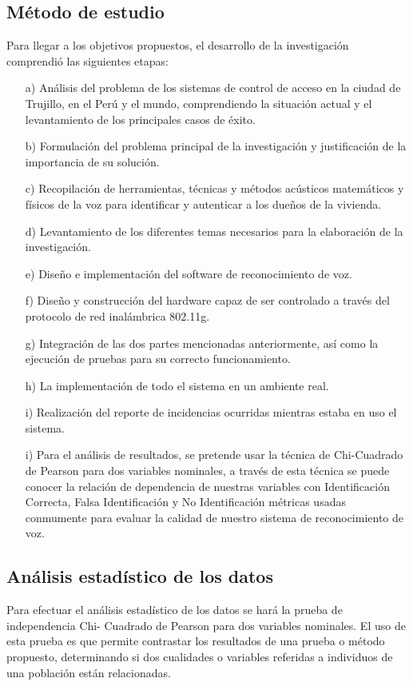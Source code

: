 \subsection{Método de estudio}
Para llegar a los objetivos propuestos, el desarrollo de la investigación comprendió las siguientes etapas:
\begin{enumerate}
\item[a)]Análisis del problema de los sistemas de control de acceso en la ciudad de Trujillo, en el Perú y el mundo, comprendiendo la situación actual y el levantamiento de los principales casos de éxito.
\item[b)]Formulación del problema principal de la investigación y justificación de la importancia de su solución.
\item[c)]Recopilación de herramientas, técnicas y métodos acústicos matemáticos y físicos de la voz para identificar y autenticar a los dueños de la vivienda.
\item[d)]Levantamiento de los diferentes temas necesarios para la elaboración de la investigación.
\item[e)]Diseño e implementación del software de reconocimiento de voz.
\item[f)]Diseño y construcción del hardware capaz de ser controlado a través del protocolo de red inalámbrica 802.11g.
\item[g)]Integración de las dos partes mencionadas anteriormente, así como la ejecución de pruebas para su correcto funcionamiento.
\item[h)]La implementación de todo el sistema en un ambiente real.
\item[i)]Realización del reporte de incidencias ocurridas mientras estaba en uso el sistema.
\item[i)]Para el análisis de resultados, se pretende usar la técnica de Chi-Cuadrado de Pearson para dos variables nominales, a través de esta técnica se puede conocer la relación de dependencia de nuestras variables con Identificación Correcta, Falsa Identificación y No Identificación métricas usadas conmumente para evaluar la calidad de nuestro sistema de reconocimiento de voz.
\end{enumerate}

\subsection{Análisis estadístico de los datos}
Para efectuar el análisis estadístico de los datos se hará la prueba de independencia Chi- Cuadrado de Pearson para dos variables nominales.
\vskip 0.5cm
El uso de esta prueba es que permite contrastar los resultados de una prueba o método propuesto, determinando si dos cualidades o variables referidas a individuos de una población están relacionadas. 

